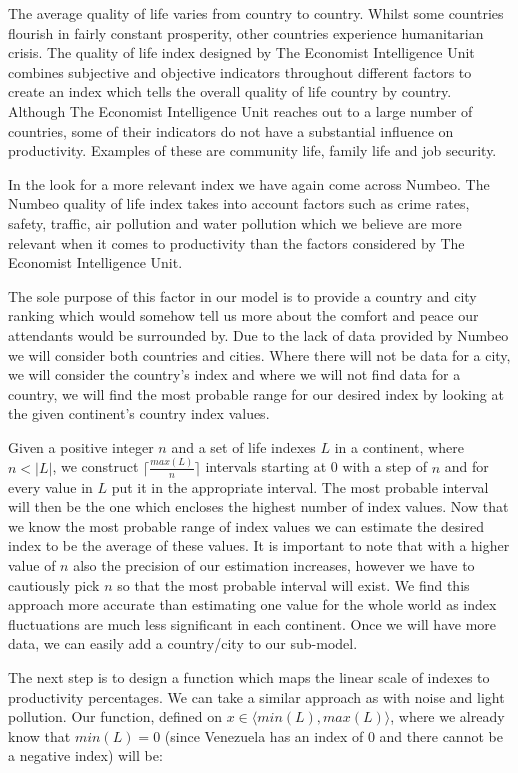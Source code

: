 The average quality of life varies from country to country. Whilst some countries flourish in fairly constant prosperity, other countries experience humanitarian crisis. The quality of life index designed by The Economist Intelligence Unit combines subjective and objective indicators throughout different factors to create an index which tells the overall quality of life country by country. Although The Economist Intelligence Unit reaches out to a large number of countries, some of their indicators do not have a substantial influence on productivity. Examples of these are community life, family life and job security. 

In the look for a more relevant index we have again come across Numbeo. The Numbeo quality of life index takes into account factors such as crime rates, safety, traffic, air pollution and water pollution which we believe are more relevant when it comes to productivity than the factors considered by The Economist Intelligence Unit. 

The sole purpose of this factor in our model is to provide a country and city ranking which would somehow tell us more about the comfort and peace our attendants would be surrounded by. Due to the lack of data provided by Numbeo we will consider both countries and cities. Where there will not be data for a city, we will consider the country's index and where we will not find data for a country, we will find the most probable range for our desired index by looking at the given continent's country index values.

Given a positive integer $n$ and a set of life indexes $L$ in a continent, where $n < |L|$, we construct $ \lceil \frac{max(L)}{n}\rceil$ intervals starting at 0 with a step of $n$ and for every value in $L$ put it in the appropriate interval. The most probable interval will then be the one which encloses the highest number of index values. Now that we know the most probable range of index values we can estimate the desired index to be the average of these values. It is important to note that with a higher value of $n$ also the precision of our estimation increases, however we have to cautiously pick $n$ so that the most probable interval will exist. We find this approach more accurate than estimating one value for the whole world as index fluctuations are much less significant in each continent. Once we will have more data, we can easily add a country/city to our sub-model.

The next step is to design a function which maps the linear scale of indexes to productivity percentages. We can take a similar approach as with noise and light pollution. Our function, defined on  $ x\in \langle min(L),max(L)\rangle$, where we already know that $min(L) = 0$ (since Venezuela has an index of 0 and there cannot be a negative index) will be: 

